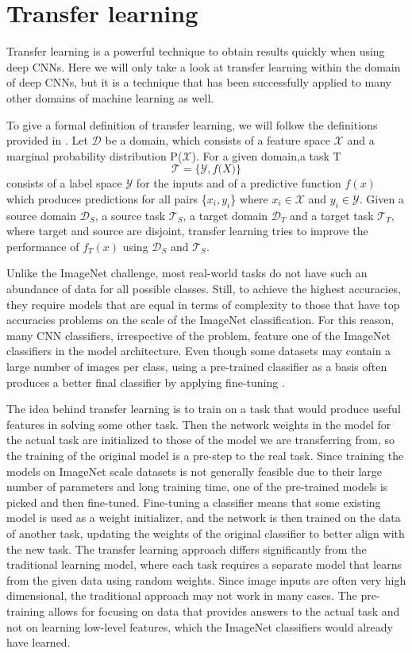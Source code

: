 \section{Transfer learning}
Transfer learning is a powerful technique to obtain results quickly when using deep CNNs. Here we will only take a look at transfer learning within the domain of deep CNNs, but it is a technique that has been successfully applied to many other domains of machine learning as well.

To give a formal definition of transfer learning, we will follow the definitions provided in \citep{transferSurvey2010}. 
Let $\mathcal{D}$ be a domain, which consists of a feature space $\mathcal{X}$ and a marginal probability distribution P($\mathcal{X}$). 
For a given domain,a task T \[\mathcal{T} = \{\mathcal{Y}, f\mathcal(X)\}\] \noindent consists of a label space $\mathcal{Y}$ for the inputs and of a predictive function $f(x)$ which produces predictions for all pairs \{$x_i, y_i$\} where $x_i \in \mathcal{X}$ and $y_i \in \mathcal{Y}$. 
Given a source domain $\mathcal{D}_S$, a source task $\mathcal{T}_S$, a target domain $\mathcal{D}_T$ and a target task $\mathcal{T}_T$, where target and source are disjoint, transfer learning tries to improve the performance of $f_T(x)$ using $\mathcal{D}_S$ and $\mathcal{T}_S$.

Unlike the ImageNet challenge, most real-world tasks do not have such an abundance of data for all possible classes. Still, to achieve the highest accuracies, they require models that are equal in terms of complexity to those that have top accuracies problems on the scale of the ImageNet classification. For this reason, many CNN classifiers, irrespective of the problem, feature one of the ImageNet classifiers in the model architecture. Even though some datasets may contain a large number of images per class, using a pre-trained classifier as a basis often produces a better final classifier by applying fine-tuning \citep{betterTransfer}.

The idea behind transfer learning is to train on a task that would produce useful features in solving some other task. 
Then the network weights in the model for the actual task are initialized to those of the model we are transferring from, so the training of the original model is a pre-step to the real task. 
Since training the models on ImageNet scale datasets is not generally feasible due to their large number of parameters and long training time, one of the pre-trained models is picked and then fine-tuned. 
Fine-tuning a classifier means that some existing model is used as a weight initializer, and the network is then trained on the data of another task, updating the weights of the original classifier to better align with the new task. 
The transfer learning approach differs significantly from the traditional learning model, where each task requires a separate model that learns from the given data using random weights. 
Since image inputs are often very high dimensional, the traditional approach may not work in many cases. 
The pre-training allows for focusing on data that provides answers to the actual task and not on learning low-level features, which the ImageNet classifiers would already have learned.


